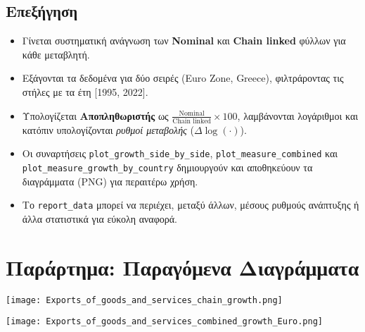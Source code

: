 \documentclass{book}
\begin{document}
\subsection*{Επεξήγηση}
\begin{itemize}
    \item Γίνεται συστηματική ανάγνωση των \textbf{Nominal} και \textbf{Chain linked} φύλλων για κάθε μεταβλητή.
    \item Εξάγονται τα δεδομένα για δύο σειρές (Euro Zone, Greece), φιλτράροντας τις στήλες με τα έτη [1995, 2022].
    \item Υπολογίζεται \textbf{Αποπληθωριστής} ως \(\frac{\text{Nominal}}{\text{Chain linked}} \times 100\), λαμβάνονται λογάριθμοι και κατόπιν υπολογίζονται \emph{ρυθμοί μεταβολής} (\(\Delta \log(\cdot)\)).
    \item Οι συναρτήσεις \texttt{plot\_growth\_side\_by\_side}, \texttt{plot\_measure\_combined} και \texttt{plot\_measure\_growth\_by\_country} δημιουργούν και αποθηκεύουν τα διαγράμματα (PNG) για περαιτέρω χρήση.
    \item Το \texttt{report\_data} μπορεί να περιέχει, μεταξύ άλλων, μέσους ρυθμούς ανάπτυξης ή άλλα στατιστικά για εύκολη αναφορά.

\end{itemize}

\section{Παράρτημα: Παραγόμενα Διαγράμματα}

\graphicspath{{/Users/thodoreskourtales/TK.MT.1/exercise.4/}}


\begin{tcolorbox}[colback=white,colframe=black,title={Εξαγωγές αγαθών και υπηρεσιών: ανάπτυξη αλυσίδας}]
  \centering
  \texttt{[image: Exports\_of\_goods\_and\_services\_chain\_growth.png]}
  \vspace{0.5em}

\end{tcolorbox}
\FloatBarrier

\begin{tcolorbox}[colback=white,colframe=black,title={Εξαγωγές αγαθών και υπηρεσιών: συνδυασμένη ανάπτυξη στην Ευρωζώνη}]
  \centering
  \texttt{[image: Exports\_of\_goods\_and\_services\_combined\_growth\_Euro.png]}
  \vspace{0.5em}

\end{tcolorbox}
\FloatBarrier
\end{document}
